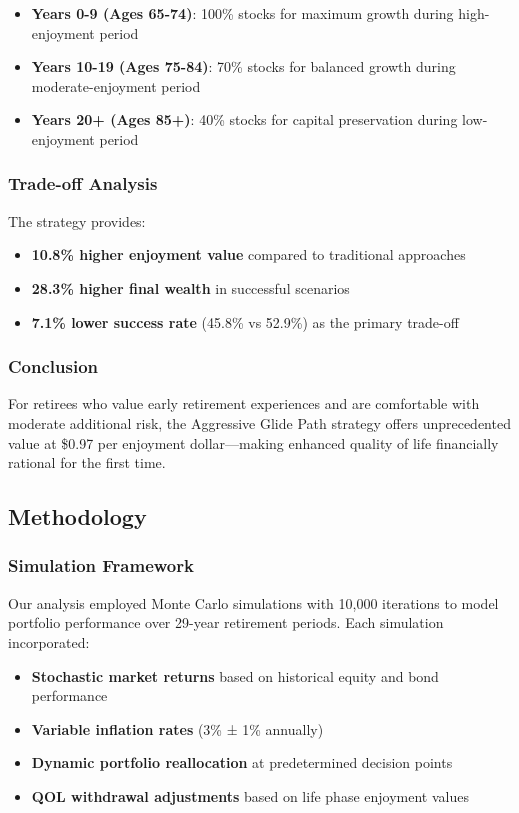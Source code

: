 \documentclass[11pt,letterpaper]{article}
\begin{document}
\begin{itemize}
\item \textbf{Years 0-9 (Ages 65-74)}: 100\% stocks for maximum growth during high-enjoyment period
\item \textbf{Years 10-19 (Ages 75-84)}: 70\% stocks for balanced growth during moderate-enjoyment period
\item \textbf{Years 20+ (Ages 85+)}: 40\% stocks for capital preservation during low-enjoyment period
\end{itemize}

\subsubsection{Trade-off Analysis}
The strategy provides:

\begin{itemize}
\item \textbf{10.8\% higher enjoyment value} compared to traditional approaches
\item \textbf{28.3\% higher final wealth} in successful scenarios
\item \textbf{7.1\% lower success rate} (45.8\% vs 52.9\%) as the primary trade-off
\end{itemize}

\subsubsection{Conclusion}
For retirees who value early retirement experiences and are comfortable with moderate additional risk, the Aggressive Glide Path strategy offers unprecedented value at \$0.97 per enjoyment dollar—making enhanced quality of life financially rational for the first time.




\subsection{Methodology}

\subsubsection{Simulation Framework}
Our analysis employed Monte Carlo simulations with 10,000 iterations to model portfolio performance over 29-year retirement periods. Each simulation incorporated:


\begin{itemize}
\item \textbf{Stochastic market returns} based on historical equity and bond performance
\item \textbf{Variable inflation rates} (3\% ± 1\% annually)
\item \textbf{Dynamic portfolio reallocation} at predetermined decision points
\item \textbf{QOL withdrawal adjustments} based on life phase enjoyment values
\end{itemize}
\end{document}
